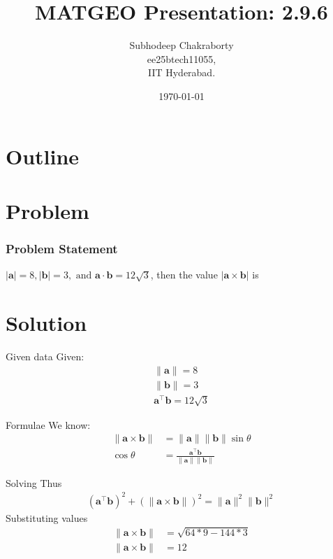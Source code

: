 \documentclass{beamer}
\title{MATGEO Presentation: 2.9.6}
\author{Subhodeep Chakraborty \\ ee25btech11055,\\IIT Hyderabad.}
\date{\today}
\providecommand{\brak}[1]{\ensuremath{\left(#1\right)}}
\theoremstyle{remark}
\providecommand{\norm}[1]{\lVert#1\rVert}
\let\vec\mathbf
\numberwithin{equation}{section}
\begin{document}
\begin{frame}
\titlepage
\end{frame}

\section*{Outline}
\begin{frame}
\tableofcontents
\end{frame}

\section{Problem}
\begin{frame}
\frametitle{Problem Statement}

$|\vec{a}| = 8, |\vec{b}| = 3, \text{ and } \vec{a}\cdot\vec{b} = 12\sqrt{3}$, then the value $|\vec{a}\times\vec{b}|$ is

\end{frame}

\section{Solution}
\begin{frame}{Given data}
Given:
\begin{align}
 \norm{\vec{a}} = 8 \\
 \norm{\vec{b}} = 3 \\
 \vec{a}^\top\vec{b} = 12\sqrt{3}
\end{align}
\end{frame}

\begin{frame}{Formulae}
We know:
\begin{align}
 \norm{\vec{a}\times\vec{b}} &= \norm{\vec{a}}\norm{\vec{b}}\sin\theta \\
 \cos\theta &= \frac{\vec{a}^\top\vec{b}}{\norm{\vec{a}}\norm{\vec{b}}}
\end{align}
\end{frame}

\begin{frame}{Solving}
Thus
\begin{align}
 \brak{\vec{a}^\top\vec{b}}^2 + \brak{\norm{\vec{a}\times\vec{b}}}^2 = \norm{\vec{a}}^2\norm{\vec{b}}^2
\end{align}
Substituting values
\begin{align}
\norm{\vec{a}\times\vec{b}} &= \sqrt{64*9-144*3} \\
\norm{\vec{a}\times\vec{b}} &= 12
\end{align}
\end{frame}
\end{document}
